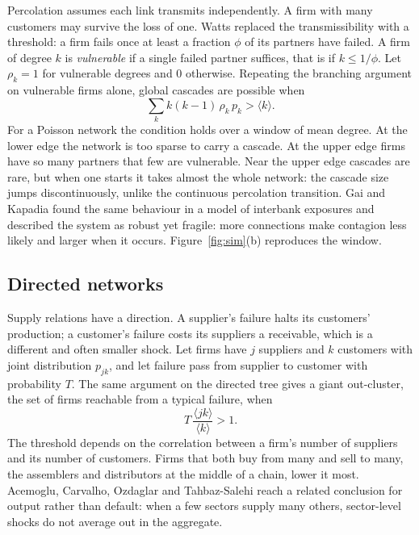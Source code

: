 \documentclass[11pt,a4paper]{article}
\theoremstyle{definition}
\theoremstyle{remark}
\newcommand{\avg}[1]{\langle #1 \rangle}
\begin{document}
Percolation assumes each link transmits independently. A firm with many customers may survive the loss of one. Watts \citep{Watts2002} replaced the transmissibility with a threshold: a firm fails once at least a fraction $\phi$ of its partners have failed. A firm of degree $k$ is \emph{vulnerable} if a single failed partner suffices, that is if $k \le 1/\phi$. Let $\rho_k = 1$ for vulnerable degrees and $0$ otherwise. Repeating the branching argument on vulnerable firms alone, global cascades are possible when
\begin{equation}
\sum_k k(k-1)\,\rho_k\, p_k > \avg{k} .
\label{eq:watts}
\end{equation}
For a Poisson network the condition holds over a window of mean degree. At the lower edge the network is too sparse to carry a cascade. At the upper edge firms have so many partners that few are vulnerable. Near the upper edge cascades are rare, but when one starts it takes almost the whole network: the cascade size jumps discontinuously, unlike the continuous percolation transition. Gai and Kapadia \citep{GaiKapadia2010} found the same behaviour in a model of interbank exposures and described the system as robust yet fragile: more connections make contagion less likely and larger when it occurs. Figure~\ref{fig:sim}(b) reproduces the window.


\subsection{Directed networks}

Supply relations have a direction. A supplier's failure halts its customers' production; a customer's failure costs its suppliers a receivable, which is a different and often smaller shock. Let firms have $j$ suppliers and $k$ customers with joint distribution $p_{jk}$, and let failure pass from supplier to customer with probability $T$. The same argument on the directed tree \citep{NewmanStrogatzWatts2001} gives a giant out-cluster, the set of firms reachable from a typical failure, when
\begin{equation}
T\,\frac{\avg{jk}}{\avg{k}} > 1 .
\end{equation}
The threshold depends on the correlation between a firm's number of suppliers and its number of customers. Firms that both buy from many and sell to many, the assemblers and distributors at the middle of a chain, lower it most. Acemoglu, Carvalho, Ozdaglar and Tahbaz-Salehi \citep{Acemoglu2012} reach a related conclusion for output rather than default: when a few sectors supply many others, sector-level shocks do not average out in the aggregate.
\end{document}

